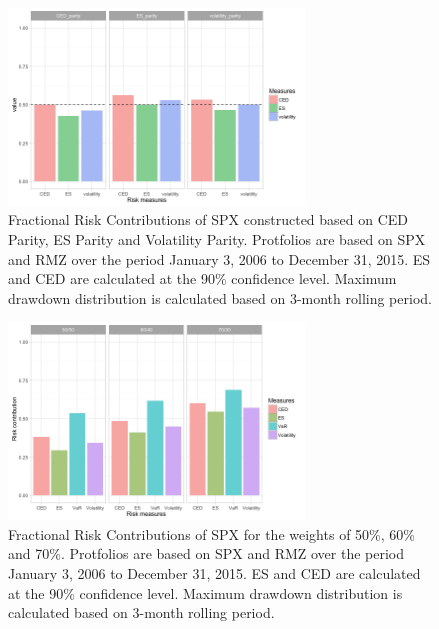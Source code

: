 \documentclass[11pt]{article}
\begin{document}
\begin{figure}[H]
\centering
\includegraphics[width = 0.7\textwidth]{../figures/risk_contribution/risk_parity}
\caption{Fractional Risk Contributions of SPX constructed based on CED Parity, ES Parity and Volatility Parity. Protfolios are based on SPX and RMZ over the period January 3, 2006 to December 31, 2015. ES and CED are calculated at the 90\% confidence level. Maximum drawdown distribution is calculated based on 3-month rolling period.}
\label{fig:risk_parity}
\end{figure}

\begin{figure}[H]
\centering
\includegraphics[width = 0.7\textwidth]{../figures/risk_contribution/overall_rc}
\caption{Fractional Risk Contributions of SPX for the weights of 50\%, 60\% and 70\%. Protfolios are based on SPX and RMZ over the period January 3, 2006 to December 31, 2015. ES and CED are calculated at the 90\% confidence level. Maximum drawdown distribution is calculated based on 3-month rolling period.}
\label{fig:overall_rc}
\end{figure}
\end{document}
